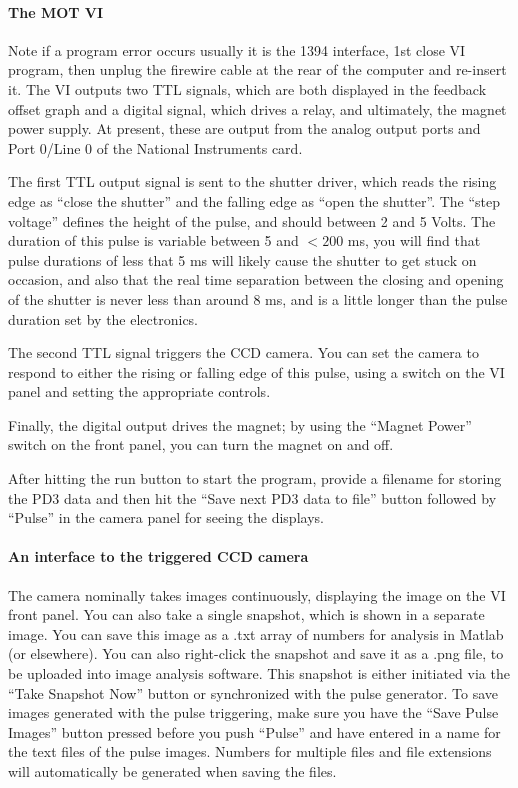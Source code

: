 \documentclass{../lab}
\begin{document}
\paragraph{The MOT VI}

Note if a program error occurs usually it is the 1394 interface, 1st close VI program, then unplug the firewire cable at the rear of the computer and re-insert it. The VI outputs two TTL signals, which are both displayed in the feedback offset graph and a digital signal, which drives a relay, and ultimately, the magnet power supply. At present, these are output from the analog output ports and Port 0/Line 0 of the National Instruments card.

The first TTL output signal is sent to the shutter driver, which reads the rising edge as ``close the shutter'' and the falling edge as ``open the shutter''. The ``step voltage'' defines the height of the pulse, and should between 2 and 5 Volts. The duration of this pulse is variable between 5 and $<200$ ms, you will find that pulse durations of less that 5 ms will likely cause the shutter to get stuck on occasion, and also that the real time separation between the closing and opening of the shutter is never less than around 8 ms, and is a little longer than the pulse duration set by the electronics.

The second TTL signal triggers the CCD camera. You can set the camera to respond to either the rising or falling edge of this pulse, using a switch on the VI panel and setting the appropriate controls.

Finally, the digital output drives the magnet; by using the ``Magnet Power'' switch on the front panel, you can turn the magnet on and off.

After hitting the run button to start the program, provide a filename for storing the PD3 data and then hit the ``Save next PD3 data to file'' button followed by ``Pulse'' in the camera panel for seeing the displays.

\paragraph{An interface to the triggered CCD camera}
\label{par:InterfaceToTriggeredCCDCamera}

The camera nominally takes images continuously, displaying the image on the VI front panel. You can also take a single snapshot, which is shown in a separate image. You can save this image as a .txt array of numbers for analysis in Matlab (or elsewhere). You can also right-click the snapshot and save it as a .png file, to be uploaded into image analysis software. This snapshot is either initiated via the ``Take Snapshot Now'' button or synchronized with the pulse generator. To save images generated with the pulse triggering, make sure you have the ``Save Pulse Images'' button pressed before you push ``Pulse'' and have entered in a name for the text files of the pulse images. Numbers for multiple files and file extensions will automatically be generated when saving the files.
\end{document}
